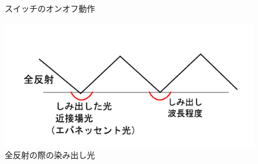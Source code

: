 \begin{figure}[t!]
 \begin{center}
  \caption{スイッチのオンオフ動作}
  \label{fig:onoff}
 \end{center}
\end{figure}
\begin{figure}[t!]
 \begin{center}
  \includegraphics[keepaspectratio,scale=0.5]{fig/3/evanescent.pdf}
  \caption{全反射の際の染み出し光}
  \label{fig:E}
 \end{center}
\end{figure}

